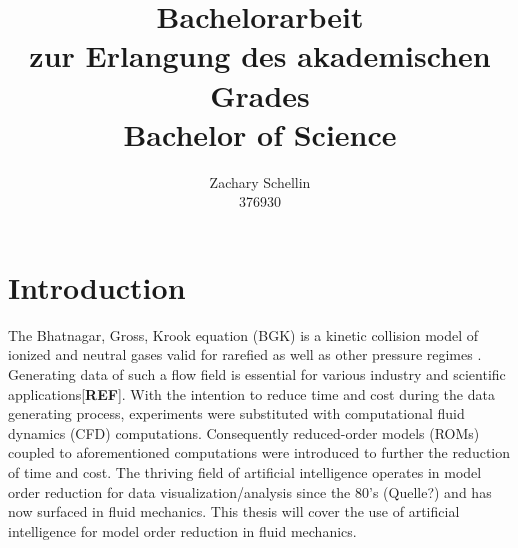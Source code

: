 \documentclass[12pt, a4paper]{article}
\begin{document}
\title{Bachelorarbeit\\ zur Erlangung des akademischen Grades\\ Bachelor of Science}
\author{Zachary Schellin\\376930}

\maketitle
\newpage
\tableofcontents
\newpage
\section{Introduction}
The Bhatnagar, Gross, Krook equation (BGK) is a kinetic collision model of ionized and neutral gases valid for rarefied as well as other pressure regimes \cite{BGK}. Generating data of such a flow field is essential for various industry and scientific applications[\textbf{REF}]. With the intention to reduce time and cost during the data generating process, experiments were substituted with computational fluid dynamics (CFD) computations. Consequently reduced-order models (ROMs) coupled to aforementioned computations were introduced to further the reduction of time and cost. The thriving field of artificial intelligence operates in model order reduction for data visualization/analysis since the 80's (Quelle?)  and has now surfaced in fluid mechanics. This thesis will cover the use of artificial intelligence for model order reduction in fluid mechanics.
\end{document}

